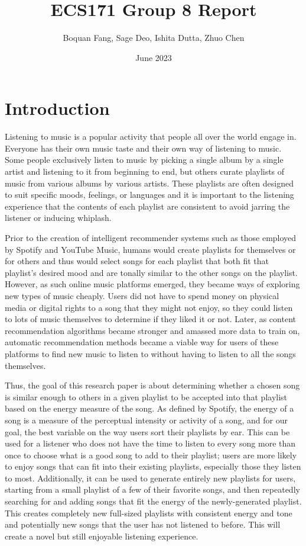 \documentclass[titlepage]{article}
\title{ECS171 Group 8 Report}
\author{Boquan Fang, Sage Deo, Ishita Dutta, Zhuo Chen}
\date{June 2023}
\begin{document}
\maketitle



\section{Introduction}
Listening to music is a popular activity that people all over the world engage in. 
Everyone has their own music taste and their own way of listening to music.
Some people exclusively listen to music by picking a single album by a single artist 
and listening to it from beginning to end, but others curate playlists of music from
various albums by various artists. These playlists are often designed to suit specific
moods, feelings, or languages and it is important to the listening experience that the contents of
each playlist are consistent to avoid jarring the listener or inducing whiplash.

Prior to the creation of intelligent recommender systems such as those employed by 
Spotify and YouTube Music, humans would create playlists for themselves or for others
and thus would select songs for each playlist that both fit that playlist's desired mood
and are tonally similar to the other songs on the playlist. However, as such 
online music platforms emerged, they became ways of exploring new types of music cheaply.
Users did not have to spend money on physical media or digital rights to a song that they
might not enjoy, so they could listen to lots of music themselves to determine if they liked it
or not. Later, as content recommendation algorithms became stronger and amassed more data
to train on, automatic recommendation methods became a viable way for users of these platforms
to find new music to listen to without having to listen to all the songs themselves. 

Thus, the goal of this research paper is about determining whether a chosen song is similar enough to others in a given playlist to be accepted into that playlist based on the energy measure of the song. As defined by Spotify, the energy of a song is a measure of the perceptual intensity or activity of a song, and for our goal, the best variable on the way users sort their playlists by ear. This can be used for a listener who does not have the time to listen to every song more than once to choose what is a good song to add to their playlist; users are more likely
to enjoy songs that can fit into their existing playlists, especially those they listen to most.
Additionally, it can be used to generate entirely new playlists for users, starting from a small
playlist of a few of their favorite songs, and then repeatedly searching for and adding songs that
fit the energy of the newly-generated playlist. This creates completely new full-sized playlists 
with consistent energy and tone and potentially new songs that the user has not listened to before.
This will create a novel but still enjoyable listening experience. 
\end{document}
